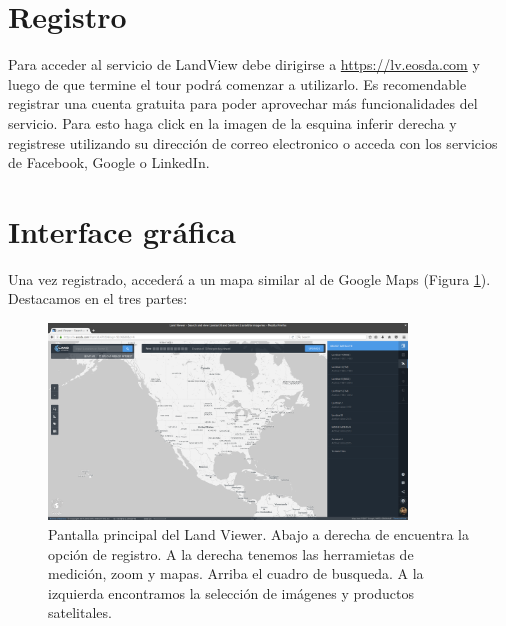 \documentclass[a4paper,12pt]{book}
\begin{document}
\section{Registro}
Para acceder al servicio de LandView debe dirigirse a \url{https://lv.eosda.com} y luego de que termine el tour podrá comenzar a utilizarlo. Es recomendable registrar una cuenta gratuita para poder aprovechar más funcionalidades del servicio. Para esto haga click en la imagen de la esquina inferir derecha y registrese utilizando su dirección de correo electronico o acceda con los servicios de Facebook, Google o LinkedIn.

\section{Interface gráfica}

Una vez registrado, accederá a un mapa  similar al de Google Maps (Figura \ref{fig:main}). Destacamos en el tres partes:

\begin{figure}[hb!]
    \centering
    \includegraphics[width=0.85\textwidth]{fig:main.png}
    \caption{Pantalla principal del Land Viewer. Abajo a derecha de encuentra la opción de registro. A la derecha tenemos las herramietas de medición, zoom y mapas. Arriba el cuadro de busqueda. A la izquierda encontramos la selección de imágenes y productos satelitales.}
    \label{fig:main}
\end{figure}
\end{document}
